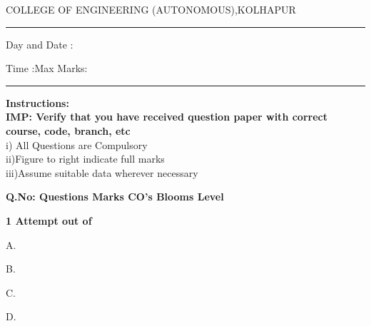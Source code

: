 \documentclass[12pt]{article}
\begin{document}
	
\par
COLLEGE OF ENGINEERING (AUTONOMOUS),KOLHAPUR
\par\noindent\rule{\textwidth}{0.4pt}

\par
{}\par
\begin{flushleft}
Day and Date :
\end{flushleft}

\begin{flushleft}
Time :\hspace{3cm}Max Marks:{}\\
\end{flushleft}
\noindent\rule{\textwidth}{0.1pt}
\begin{flushleft}
{\bf Instructions:}\\
{\hspace{0.5cm} \bf IMP: Verify that you have received question paper with correct course, code, branch, etc}\\
\hspace{1cm}i) All Questions are Compulsory\\
\hspace{1cm}ii)Figure to right indicate full marks\\
\hspace{1cm}iii)Assume suitable data wherever necessary\\
\end{flushleft} 

\begin{flushleft}
{\bf Q.No: \hspace{2.5cm} \bf Questions \hspace{0.25cm} \bf Marks \hspace{0.25cm} \bf CO's\hspace{0.25cm} \bf Blooms Level}	
\end{flushleft}

\begin{flushleft}
		\bf 1 \hspace{2cm} Attempt  out of \\  

\end{flushleft}
\begin{flushleft}
\hspace{1cm}\par
\begin{flushleft}
\hspace{1cm}A.\par
\hspace{1cm}B.\par
\hspace{1cm}C.\par
\hspace{1cm}D.\par

\end{flushleft}
\end{flushleft}
\end{document}
